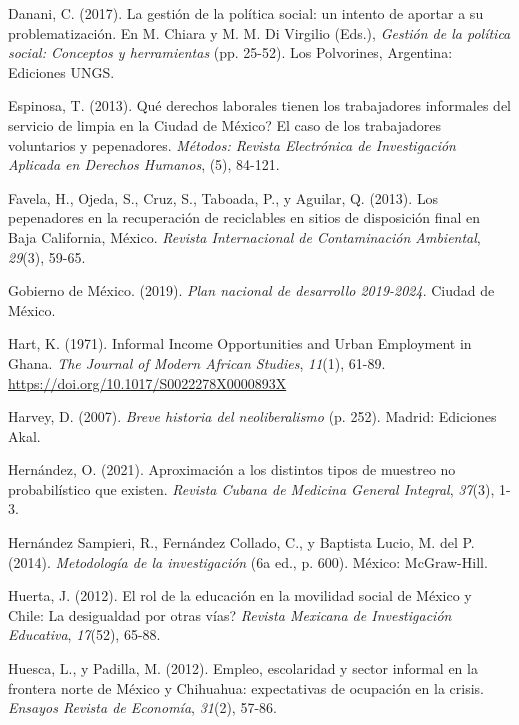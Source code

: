 \documentclass[
  spanish,
  11.5pt,
  170mm x 240mmpaper,
]{scrbook}
\newlength{\cslhangindent}
\newenvironment{CSLReferences}[2] %
 {\begin{list}{}{%
  \setlength{\itemindent}{0pt}
  \setlength{\leftmargin}{0pt}
  \setlength{\parsep}{0pt}
  \ifodd #1
   \setlength{\leftmargin}{\cslhangindent}
   \setlength{\itemindent}{-1\cslhangindent}
  \fi
  \setlength{\itemsep}{#2\baselineskip}}}
 {\end{list}}
\begin{document}
\begin{CSLReferences}{1}{0}
Danani, C. (2017). {La gestión de la política social: un intento de
aportar a su problematización}. En M. Chiara y M. M. Di Virgilio (Eds.),
\emph{{Gestión de la política social: Conceptos y herramientas}} (pp.
25-52). Los Polvorines, Argentina: Ediciones UNGS.

Espinosa, T. (2013). {\textquestiondown Qué derechos laborales tienen
los trabajadores informales del servicio de limpia en la Ciudad de
México? El caso de los trabajadores voluntarios y pepenadores}.
\emph{Métodos: Revista Electrónica de Investigación Aplicada en Derechos
Humanos}, (5), 84-121.

Favela, H., Ojeda, S., Cruz, S., Taboada, P., y Aguilar, Q. (2013). {Los
pepenadores en la recuperación de reciclables en sitios de disposición
final en Baja California, México}. \emph{Revista Internacional de
Contaminación Ambiental}, \emph{29}(3), 59-65.

Gobierno de México. (2019). \emph{{Plan nacional de desarrollo
2019-2024}}. Ciudad de México.

Hart, K. (1971). Informal Income Opportunities and Urban Employment in
Ghana. \emph{The Journal of Modern African Studies}, \emph{11}(1),
61-89. \url{https://doi.org/10.1017/S0022278X0000893X}

Harvey, D. (2007). \emph{{Breve historia del neoliberalismo}} (p. 252).
Madrid: Ediciones Akal.

Hernández, O. (2021). {Aproximación a los distintos tipos de muestreo no
probabilístico que existen}. \emph{Revista Cubana de Medicina General
Integral}, \emph{37}(3), 1-3.

Hernández Sampieri, R., Fernández Collado, C., y Baptista Lucio, M. del
P. (2014). \emph{{Metodología de la investigación}} (6a ed., p. 600).
México: McGraw-Hill.

Huerta, J. (2012). {El rol de la educación en la movilidad social de
México y Chile: \textquestiondown La desigualdad por otras vías?}
\emph{Revista Mexicana de Investigación Educativa}, \emph{17}(52),
65-88.

Huesca, L., y Padilla, M. (2012). {Empleo, escolaridad y sector informal
en la frontera norte de México y Chihuahua: expectativas de ocupación en
la crisis}. \emph{Ensayos Revista de Economía}, \emph{31}(2), 57-86.


\end{CSLReferences}
\end{document}

